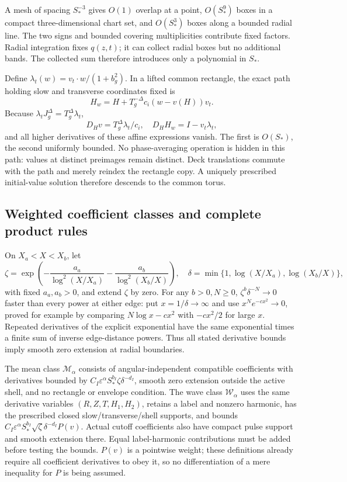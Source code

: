 \documentclass[10pt,a4paper]{article}
\begin{document}
A mesh of spacing \(S_*^{-3}\) gives \(O(1)\) overlap at a point, \(O(S_*^9)\) boxes in a compact three-dimensional chart set, and \(O(S_*^3)\) boxes along a bounded radial line. The two signs and bounded covering multiplicities contribute fixed factors. Radial integration fixes \(q(z,t)\); it can collect radial boxes but no additional bands. The collected sum therefore introduces only a polynomial in \(S_*\).

Define \(\lambda_t(w)=v_t\cdot w/(1+b_g^2)\). In a lifted common rectangle, the exact path holding slow and transverse coordinates fixed is \[
H_w=H+T_g^{-\Delta}c_i(w-v(H))v_t.
\] Because \(\lambda_tJ_g^\Delta=T_g^\Delta\lambda_t\), \[
D_Hv=T_g^\Delta\lambda_t/c_i,\quad
D_HH_w=I-v_t\lambda_t,
\] and all higher derivatives of these affine expressions vanish. The first is \(O(S_*)\), the second uniformly bounded. No phase-averaging operation is hidden in this path: values at distinct preimages remain distinct. Deck translations commute with the path and merely reindex the rectangle copy. A uniquely prescribed initial-value solution therefore descends to the common torus.

\subsection{Weighted coefficient classes and complete product rules}\label{weighted-coefficient-classes-and-complete-product-rules}

On \(X_a<X<X_b\), let \[
\zeta=\exp\left(-\frac{a_a}{\log^2(X/X_a)}-\frac{a_b}{\log^2(X_b/X)}\right),
\quad\delta=\min\{1,\log(X/X_a),\log(X_b/X)\},
\] with fixed \(a_a,a_b>0\), and extend \(\zeta\) by zero. For any \(b>0,N\ge0\), \(\zeta^b\delta^{-N}\to0\) faster than every power at either edge: put \(x=1/\delta\to\infty\) and use \(x^Ne^{-cx^2}\to0\), proved for example by comparing \(N\log x-cx^2\) with \(-cx^2/2\) for large \(x\). Repeated derivatives of the explicit exponential have the same exponential times a finite sum of inverse edge-distance powers. Thus all stated derivative bounds imply smooth zero extension at radial boundaries.

The mean class \(\mathcal M_\alpha\) consists of angular-independent compatible coefficients with derivatives bounded by \(C_I\varepsilon^\alpha S_*^{b_I}\zeta\delta^{-d_I}\), smooth zero extension outside the active shell, and no rectangle or envelope condition. The wave class \(\mathcal W_\alpha\) uses the same derivative variables \((R,Z,T,H_1,H_2)\), retains a label and nonzero harmonic, has the prescribed closed slow/transverse/shell supports, and bounds \(C_I\varepsilon^\alpha S_*^{b_I}\sqrt\zeta\delta^{-d_I}P(v)\). Actual cutoff coefficients also have compact pulse support and smooth extension there. Equal label-harmonic contributions must be added before testing the bounds. \(P(v)\) is a pointwise weight; these definitions already require all coefficient derivatives to obey it, so no differentiation of a mere inequality for \(P\) is being assumed.
\end{document}
